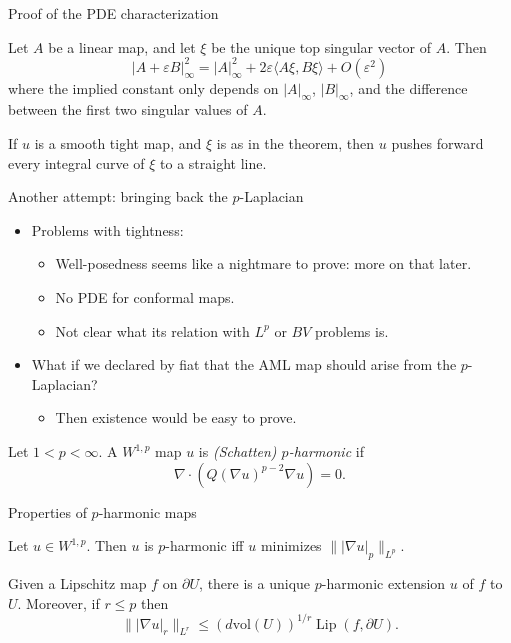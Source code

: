 \documentclass[10pt]{beamer}
\DeclareMathOperator{\Lip}{Lip}
\begin{document}
\begin{frame}{Proof of the PDE characterization}
\begin{lemma}
Let $A$ be a linear map, and let $\xi$ be the unique top singular vector of $A$. Then
$$|A + \varepsilon B|_\infty^2 = |A|_\infty^2 + 2\varepsilon \langle A\xi, B\xi\rangle + O(\varepsilon^2)$$
where the implied constant only depends on $|A|_\infty$, $|B|_\infty$, and the difference between the first two singular values of $A$.
\end{lemma}

\begin{lemma}
If $u$ is a smooth tight map, and $\xi$ is as in the theorem, then $u$ pushes forward every integral curve of $\xi$ to a straight line.
\end{lemma}
\end{frame}

\begin{frame}{Another attempt: bringing back the $p$-Laplacian}
\begin{itemize}
\item Problems with tightness:
\begin{itemize}
\item Well-posedness seems like a nightmare to prove: more on that later.
\item No PDE for conformal maps.
\item Not clear what its relation with $L^p$ or $BV$ problems is.
\end{itemize}
\item What if we declared by fiat that the AML map should arise from the $p$-Laplacian?
\begin{itemize}
\item Then existence would be easy to prove.
\end{itemize}
\end{itemize}

\begin{definition}
Let $1 < p < \infty$.
A $W^{1, p}$ map $u$ is \emph{(Schatten) $p$-harmonic} if
$$\nabla \cdot (Q(\nabla u)^{p - 2} \nabla u) = 0.$$
\end{definition}
\end{frame}

\begin{frame}{Properties of $p$-harmonic maps}
\begin{lemma}
Let $u \in W^{1, p}$. Then $u$ is $p$-harmonic iff $u$ minimizes $\||\nabla u|_p\|_{L^p}$.
\end{lemma}

\begin{lemma}
Given a Lipschitz map $f$ on $\partial U$, there is a unique $p$-harmonic extension $u$ of $f$ to $U$.
Moreover, if $r \leq p$ then
$$\||\nabla u|_r\|_{L^r} \leq (d\mathrm{vol}(U))^{1/r} \Lip(f, \partial U).$$
\end{lemma}
    
\end{frame}
\end{document}
